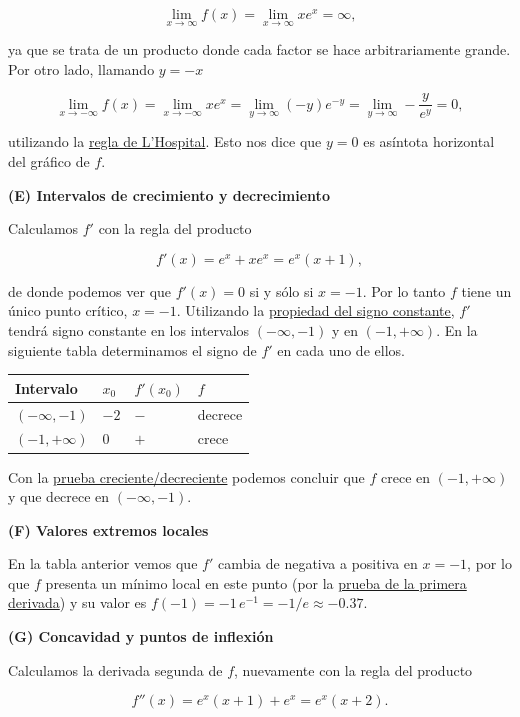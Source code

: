 \documentclass[
  letterpaper,
]{book}
\theoremstyle{plain}
\theoremstyle{remark}
\begin{document}
\begin{tcolorbox}
\[
\lim_{x\to\infty} f(x)=\lim_{x\to \infty} xe^x=\infty,
\]

ya que se trata de un producto donde cada factor se hace arbitrariamente
grande. Por otro lado, llamando \(y=-x\)

\[
\lim_{x\to-\infty} f(x)=\lim_{x\to -\infty} xe^x=\lim_{y\to \infty} (-y)e^{-y}=\lim_{y\to \infty} -\frac{y}{e^y}=0,
\]

utilizando la \hyperref[teo-regla-LH]{regla de L'Hospital}. Esto nos
dice que \(y=0\) es asíntota horizontal del gráfico de \(f\).

\textbf{(E) Intervalos de crecimiento y decrecimiento}

Calculamos \(f'\) con la regla del producto

\[
f'(x)=e^x+xe^x=e^x(x+1),
\]

de donde podemos ver que \(f'(x)=0\) si y sólo si \(x=-1\). Por lo tanto
\(f\) tiene un único punto crítico, \(x=-1\). Utilizando la
\hyperref[teo-propiedad-signoconst]{propiedad del signo constante},
\(f'\) tendrá signo constante en los intervalos \((-\infty, -1)\) y en
\((-1,+\infty)\). En la siguiente tabla determinamos el signo de \(f'\)
en cada uno de ellos.

\begin{longtable}[]{@{}llll@{}}
\toprule\noalign{}
Intervalo & \(x_0\) & \(f'(x_0)\) & \(f\) \\
\midrule\noalign{}
\endhead
\bottomrule\noalign{}
\endlastfoot
\((-\infty,-1)\) & \(-2\) & \(-\) & decrece \\
\((-1,+\infty)\) & 0 & \(+\) & crece \\
\end{longtable}

Con la \hyperref[teo-prueba-cd]{prueba creciente/decreciente} podemos
concluir que \(f\) crece en \((-1,+\infty)\) y que decrece en
\((-\infty,-1)\).

\textbf{(F) Valores extremos locales}

En la tabla anterior vemos que \(f'\) cambia de negativa a positiva en
\(x=-1\), por lo que \(f\) presenta un mínimo local en este punto (por
la \hyperref[teo-prueba-primerader]{prueba de la primera derivada}) y su
valor es \(f(-1)=-1\,e^{-1}=-1/e\approx -0.37\).

\textbf{(G) Concavidad y puntos de inflexión}

Calculamos la derivada segunda de \(f\), nuevamente con la regla del
producto

\[
f''(x)=e^x(x+1)+e^x=e^x(x+2).
\]


\end{tcolorbox}
\end{document}
